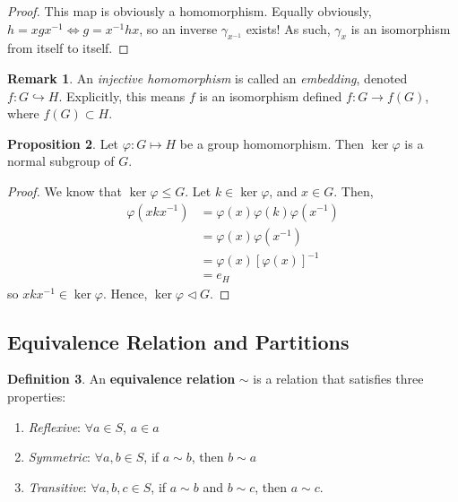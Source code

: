 \documentclass[11pt]{amsart} %
\theoremstyle{definition}
\newtheorem{definition}{Definition}[section]
\newtheorem{proposition}[definition]{Proposition}
\theoremstyle{definition}
\newtheorem{remark}[definition]{Remark}
\numberwithin{equation}{section}
\begin{document}
\begin{proof}
	This map is obviously a homomorphism. Equally obviously, $h = xgx^{-1} \iff g = x^{-1} hx$, so an inverse $\gamma_{x^{-1}}$ exists! As such, $\gamma_x$ is an isomorphism from itself to itself.
\end{proof}

\begin{remark}
	An \textit{injective homomorphism} is called an \textit{embedding}, denoted $f: G \hookrightarrow H$. Explicitly, this means $f$ is an isomorphism defined $f: G \to f(G)$, where $f(G) \subset H$.
\end{remark}

\begin{proposition}
	Let $\varphi: G \mapsto H$ be a group homomorphism. Then $\ker \varphi$ is a normal subgroup of $G$.
\end{proposition}

\begin{proof}
	We know that $\ker \varphi \leq G$. Let $k \in \ker \varphi$, and $x \in G$. Then,
	$$\begin{aligned}
	\varphi (x k x^{-1}) &= \varphi (x) \varphi (k) \varphi ( x^{-1})  \\
	&= \varphi (x) \varphi (x^{-1}) \\
	&= \varphi (x) [\varphi (x)]^{-1} \\
	&= e_H	
	\end{aligned}$$
	so $x k x^{-1} \in \ker \varphi$. Hence, $\ker \varphi \lhd G$.
\end{proof}

\subsection{Equivalence Relation and Partitions}

\begin{definition}
	An \textbf{equivalence relation} $\sim$ is a relation that satisfies three properties:
	\begin{enumerate}[noitemsep]
		\item \textit{Reflexive}: $\forall a \in S$, $a \in a$
		\item \textit{Symmetric}: $\forall a,b \in S$, if $a \sim b$, then $b \sim a$
		\item \textit{Transitive}: $\forall a,b,c \in S$, if $a \sim b$ and $b \sim c$, then $a \sim c$.
	\end{enumerate}
\end{definition}
\end{document}

